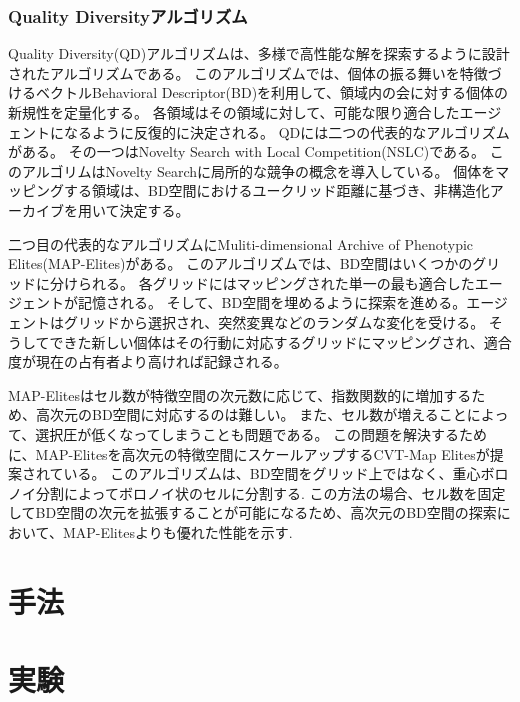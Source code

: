\documentclass[uplatex,11pt,openany]{ujreport}
\begin{document}
        \subsection{Quality Diversityアルゴリズム}
        Quality Diversity(QD)アルゴリズムは、多様で高性能な解を探索するように設計されたアルゴリズムである\cite{pugh_quality_2016}。
        このアルゴリズムでは、個体の振る舞いを特徴づけるベクトルBehavioral Descriptor(BD)を利用して、領域内の会に対する個体の新規性を定量化する。
        各領域はその領域に対して、可能な限り適合したエージェントになるように反復的に決定される。
        QDには二つの代表的なアルゴリズムがある。
        その一つはNovelty Search with Local Competition(NSLC)\cite{lehman_evolving_2011}である。
        このアルゴリムはNovelty Searchに局所的な競争の概念を導入している。
        個体をマッピングする領域は、BD空間におけるユークリッド距離に基づき、非構造化アーカイブを用いて決定する。

        二つ目の代表的なアルゴリズムにMuliti-dimensional Archive of Phenotypic Elites(MAP-Elites)\cite{mouret_illuminating_2015}がある。
        このアルゴリズムでは、BD空間はいくつかのグリッドに分けられる。
        各グリッドにはマッピングされた単一の最も適合したエージェントが記憶される。
        そして、BD空間を埋めるように探索を進める。エージェントはグリッドから選択され、突然変異などのランダムな変化を受ける。
        そうしてできた新しい個体はその行動に対応するグリッドにマッピングされ、適合度が現在の占有者より高ければ記録される。

        MAP-Elitesはセル数が特徴空間の次元数に応じて、指数関数的に増加するため、高次元のBD空間に対応するのは難しい。
        また、セル数が増えることによって、選択圧が低くなってしまうことも問題である。
        この問題を解決するために、MAP-Elitesを高次元の特徴空間にスケールアップするCVT-Map Elites\cite{vassiliades_using_2017}が提案されている。
        このアルゴリズムは、BD空間をグリッド上ではなく、重心ボロノイ分割によってボロノイ状のセルに分割する.
        この方法の場合、セル数を固定してBD空間の次元を拡張することが可能になるため、高次元のBD空間の探索において、MAP-Elitesよりも優れた性能を示す.






\chapter{手法}

\chapter{実験}
\end{document}
